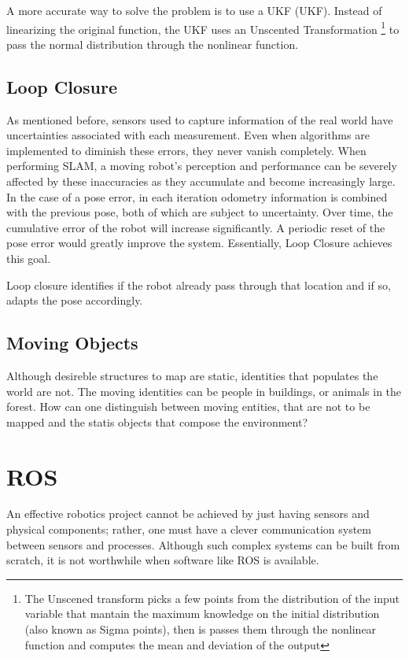  A more accurate way to solve the problem is to use a \acl*{UKF} (\acs*{UKF}). Instead of linearizing the original function, the \acs*{UKF} uses an Unscented Transformation \footnote{The Unscened transform picks a few points from the distribution of the input variable that mantain the maximum knowledge on the initial distribution (also known as Sigma points), then is passes them through the nonlinear function and computes the mean and deviation of the output} to pass the normal distribution through the nonlinear function.

\subsection{Loop Closure}


As mentioned before, sensors used to capture information of the real world have uncertainties associated with each measurement. Even when algorithms are implemented to diminish these errors, they never vanish completely. When performing \acs*{SLAM}, a moving robot's perception and performance can be severely affected by these inaccuracies as they accumulate and become increasingly large. In the case of a pose error, in each iteration odometry information is combined with the previous pose, both of which are subject to uncertainty. Over time, the cumulative error of the robot will increase significantly. A periodic reset of the pose error would greatly improve the system. Essentially, Loop Closure achieves this goal.


Loop closure identifies if the robot already pass through that location and if so, adapts the pose accordingly.

\subsection{Moving Objects}

Although desireble structures to map are static, identities that populates the world are not. The moving identities can be people in buildings, or animals in the forest. How can one distinguish between moving entities, that are not to be mapped and the statis objects that compose the environment?


\section{\acs{ROS}}

An effective robotics project cannot be achieved by just having sensors and physical components; rather, one must have a clever communication system between sensors and processes. Although such complex systems can be built from scratch, it is not worthwhile when software like \acs*{ROS} is available.

